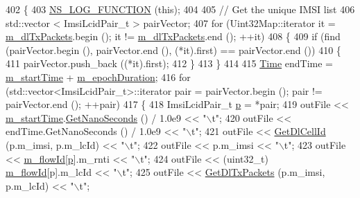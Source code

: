 \begin{DoxyCode}
402 \{
403   \hyperlink{log-macros-disabled_8h_a90b90d5bad1f39cb1b64923ea94c0761}{NS\_LOG\_FUNCTION} (\textcolor{keyword}{this});
404 
405   \textcolor{comment}{// Get the unique IMSI list}
406   std::vector < ImsiLcidPair\_t > pairVector;
407   \textcolor{keywordflow}{for} (Uint32Map::iterator it = \hyperlink{classns3_1_1MmWaveBearerStatsCalculator_a37b485984dd42a821245655ae8954271}{m\_dlTxPackets}.begin (); it != 
      \hyperlink{classns3_1_1MmWaveBearerStatsCalculator_a37b485984dd42a821245655ae8954271}{m\_dlTxPackets}.end (); ++it)
408     \{
409       \textcolor{keywordflow}{if} (find (pairVector.begin (), pairVector.end (), (*it).first) == pairVector.end ())
410         \{
411           pairVector.push\_back ((*it).first);
412         \}
413     \}
414 
415   \hyperlink{namespacens3_1_1TracedValueCallback_a7ffd3e7c142ffe7c8a1d2db9b8de38ec}{Time} endTime = \hyperlink{classns3_1_1MmWaveBearerStatsCalculator_ab4b3e7ac6ccb03b3e93e0c9b197e91b2}{m\_startTime} + \hyperlink{classns3_1_1MmWaveBearerStatsCalculator_a767bc28726f63f18fa581cd97c4958c4}{m\_epochDuration};
416   \textcolor{keywordflow}{for} (std::vector<ImsiLcidPair\_t>::iterator pair = pairVector.begin (); pair != pairVector.end (); ++pair)
417     \{
418       ImsiLcidPair\_t \hyperlink{lte__link__budget_8m_ac9de518908a968428863f829398a4e62}{p} = *pair;
419       outFile << \hyperlink{classns3_1_1MmWaveBearerStatsCalculator_ab4b3e7ac6ccb03b3e93e0c9b197e91b2}{m\_startTime}.\hyperlink{classns3_1_1Time_a2fdb7bf0e1f5cd93b6149cb37bbb7f08}{GetNanoSeconds} () / 1.0e9 << \textcolor{stringliteral}{"\(\backslash\)t"};
420       outFile << endTime.GetNanoSeconds () / 1.0e9 << \textcolor{stringliteral}{"\(\backslash\)t"};
421       outFile << \hyperlink{classns3_1_1MmWaveBearerStatsCalculator_a92f09c4f6fd7758a181ba98acc1724ba}{GetDlCellId} (p.m\_imsi, p.m\_lcId) << \textcolor{stringliteral}{"\(\backslash\)t"};
422       outFile << p.m\_imsi << \textcolor{stringliteral}{"\(\backslash\)t"};
423       outFile << \hyperlink{classns3_1_1MmWaveBearerStatsCalculator_ac2cfada765e9b57387e6831ec6eef162}{m\_flowId}[\hyperlink{lte__link__budget_8m_ac9de518908a968428863f829398a4e62}{p}].m\_rnti << \textcolor{stringliteral}{"\(\backslash\)t"};
424       outFile << (uint32\_t) \hyperlink{classns3_1_1MmWaveBearerStatsCalculator_ac2cfada765e9b57387e6831ec6eef162}{m\_flowId}[p].m\_lcId << \textcolor{stringliteral}{"\(\backslash\)t"};
425       outFile << \hyperlink{classns3_1_1MmWaveBearerStatsCalculator_a64148240c11d7a6fa8f592d459ec4c57}{GetDlTxPackets} (p.m\_imsi, p.m\_lcId) << \textcolor{stringliteral}{"\(\backslash\)t"};

\end{DoxyCode}
